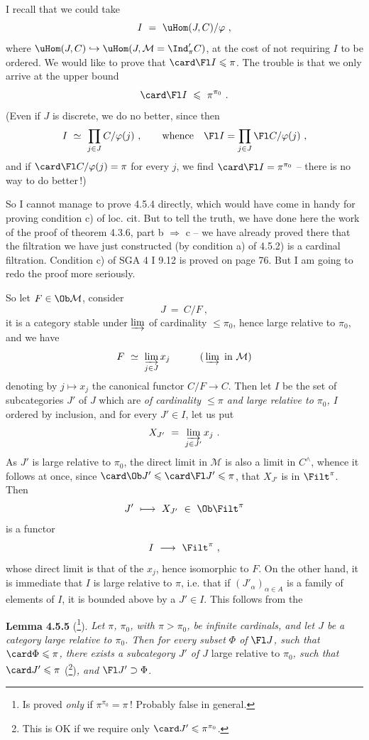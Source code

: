 
I recall that we could take
\[
I \ =\ \uHom(J,C)/\varphi\ ,
\]
where $\uHom(J,C) \hookrightarrow \uHom(J, \mathcal{M} = \Ind'_{\pi}C)$, at the cost of not requiring $I$ to be ordered. We would like to prove that $\card\Fl I \leqslant \pi$. The trouble is that we only arrive at the upper bound
\[
\card\Fl I \ \leqslant\ \pi^{\pi_0}\ .
\]
(Even if $J$ is discrete, we do no better, since then
\[
I \ \simeq\ \prod_{j\in J} C/\varphi(j)\ , \qquad \text{whence} \quad \Fl I = \prod_{j\in J} \Fl C/\varphi(j)\ ,
\]
and if $\card\Fl C/\varphi(j) = \pi$ for every $j$, we find $\card\Fl I = \pi^{\pi_0}$ -- there is no way to do better\,!)

So I cannot manage to prove 4.5.4 directly, which would have come in handy for proving condition c) of loc. cit. But to tell the truth, we have done here the work of the proof of theorem 4.3.6, part b $\Longrightarrow$ c -- we have already proved there that the filtration we have just constructed (by condition a) of 4.5.2) is a cardinal filtration. Condition c) of SGA 4 I 9.12 is proved on page 76. But I am going to redo
the proof more seriously.

So let $F \in \Ob\mathcal{M}$, consider
\[
J \ =\ C/F\ ,
\]
it is a category stable under $\varinjlim$ of cardinality $\leqslant \pi_0$, hence large relative to $\pi_0$, and we have
\[
F \ \simeq\ \varinjlim_{j\in J} x_j \qquad\quad (\,\varinjlim \ \text{in } \mathcal{M})
\]
denoting by $j \longmapsto x_j$ the canonical functor $C/F \longrightarrow C$. Then let $I$ be the set of subcategories $J'$ of $J$ which are \textit{of cardinality $\leqslant \pi$ and large relative to $\pi_0$, $I$} ordered by inclusion, and for every $J' \in I$, let us put
\[
X_{J'} \ =\ \varinjlim_{j\in J'} x_j\ .
\]
As $J'$ is large relative to $\pi_0$, the direct limit in $\mathcal{M}$ is also a limit in $C^{\wedge}$, whence it follows at once, since $\card\Ob J' \leqslant \card\Fl J' \leqslant \pi$, that $X_{J'}$ is in $\Filt^{\pi}$. Then
\[
J' \ \longmapsto\ X_{J'} \ \in\ \Ob\Filt^{\pi}
\]
is a functor
\[
I \ \longrightarrow\ \Filt^{\pi}\ ,
\]
whose direct limit is that of the $x_j$, hence isomorphic to $F$. On the other hand, it is immediate that $I$ is large relative to $\pi$, i.e. that if $(J'_{\alpha})_{\alpha\in A}$ is
a family of elements of $I$, it is bounded above by a $J' \in I$. This follows from the

\textbf{Lemma 4.5.5} (\footnote{Is proved \textit{only} if $\pi^{\pi_0} = \pi$\,! Probably false in general.}). \textit{Let $\pi$, $\pi_0$, with $\pi > \pi_0$, be infinite cardinals, and let $J$ be a category large relative to $\pi_0$. Then for every subset $\Phi$ of} $\Fl J$\textit{, such that} $\card\Phi \leqslant \pi$\textit{, there exists a subcategory $J'$ of $J$} large relative to $\pi_0$\textit{, such that} $\card J' \leqslant \pi$ (\footnote{This is OK if we require only $\card J' \leqslant \pi^{\pi_0}$.})\textit{, and} $\Fl J' \supset \Phi$.

